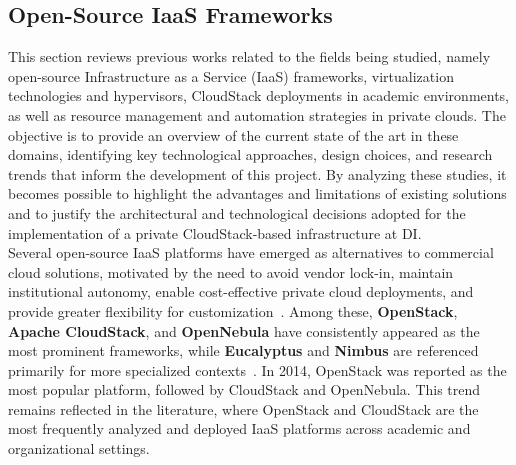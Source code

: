 \documentclass[sigplan]{acmart}
\begin{document}
    \subsection{Open-Source IaaS Frameworks}
        This section reviews previous works related to the fields being studied, namely open-source Infrastructure as a Service (IaaS) frameworks, virtualization technologies and hypervisors, CloudStack deployments in academic environments, as well as resource management and automation strategies in private clouds. 
        The objective is to provide an overview of the current state of the art in these domains, identifying key technological approaches, design choices, and research trends that inform the development of this project. 
        By analyzing these studies, it becomes possible to highlight the advantages and limitations of existing solutions and to justify the architectural and technological decisions adopted for the implementation of a private CloudStack-based infrastructure at DI.\\
    
        Several open-source IaaS platforms have emerged as alternatives to commercial cloud solutions, motivated by the need to avoid vendor lock-in, maintain institutional autonomy, enable cost-effective private cloud deployments, and provide greater flexibility for customization~\cite{lynnComparativeStudyCurrent2015}. Among these, \textbf{OpenStack}, \textbf{Apache CloudStack}, and \textbf{OpenNebula} have consistently appeared as the most prominent frameworks, while \textbf{Eucalyptus} and \textbf{Nimbus} are referenced primarily for more specialized contexts~\cite{lynnComparativeStudyCurrent2015, arunaOpenSourceIaaS2016}. In 2014, OpenStack was reported as the most popular platform, followed by CloudStack and OpenNebula\cite{williamsTopOpenSource2014}. This trend remains reflected in the literature, where OpenStack and CloudStack are the most frequently analyzed and deployed IaaS platforms across academic and organizational settings.
    
\end{document}
